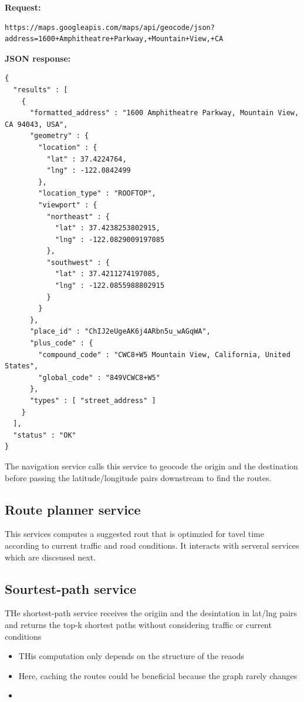 \documentclass{report}
\theoremstyle{definition}
\let\oldsubsection\subsection
\renewcommand{\subsection}{\oldsubsection*}
\begin{document}
\textbf{Request:}

\begin{lstlisting}
https://maps.googleapis.com/maps/api/geocode/json?address=1600+Amphitheatre+Parkway,+Mountain+View,+CA
\end{lstlisting}

\textbf{JSON response:}

\begin{lstlisting}
{
  "results" : [
    {
      "formatted_address" : "1600 Amphitheatre Parkway, Mountain View, CA 94043, USA",
      "geometry" : {
        "location" : {
          "lat" : 37.4224764,
          "lng" : -122.0842499
        },
        "location_type" : "ROOFTOP",
        "viewport" : {
          "northeast" : {
            "lat" : 37.4238253802915,
            "lng" : -122.0829009197085
          },
          "southwest" : {
            "lat" : 37.4211274197085,
            "lng" : -122.0855988802915
          }
        }
      },
      "place_id" : "ChIJ2eUgeAK6j4ARbn5u_wAGqWA",
      "plus_code" : {
        "compound_code" : "CWC8+W5 Mountain View, California, United States",
        "global_code" : "849VCWC8+W5"
      },
      "types" : [ "street_address" ]
    }
  ],
  "status" : "OK"
}
\end{lstlisting}

The navigation service calls this service to geocode the origin and the destination before passing the latitude/longitude pairs downstream to find the routes.

\subsection{Route planner service}

This services computes a suggested rout that is optimzied for tavel time according to current traffic and road conditions. It interacts
with serveral services which are discsused next.

\subsection{Sourtest-path service}

THe shortest-path service receives the origiin and the desintation in lat/lng pairs and returns the top-k shortest paths without considering traffic or current conditions

\begin{itemize}
\item
THis computation only depends on the structure of the reaods
\item
Here, caching the routes could be beneficial because the graph rarely changes
\item
\end{itemize}
\end{document}
